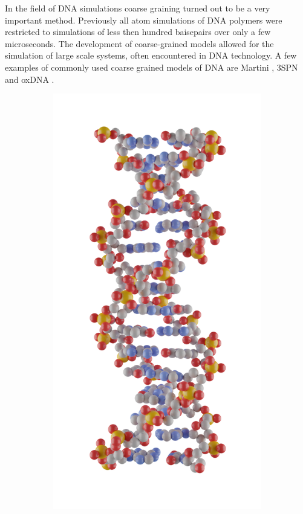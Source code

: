In the field of DNA simulations coarse graining turned out to be a very important
method. Previously all atom simulations of DNA polymers were restricted to simulations of
less then hundred baisepairs over only a few microseconds. The development of
coarse-grained models allowed for the simulation of large scale systems, often
encountered in DNA technology. A few examples of commonly used coarse grained models of
DNA are Martini \cite{Souza2021}, 3SPN \cite{Freeman2011} and oxDNA
\cite{Ouldridge2010}.\\

\begin{figure}[ht]
  \begin{centering}
  \begin{subfigure}[t]{\dimexpr.3\linewidth-1.3em\relax}
  \centering
  \vspace{-0.9cm}
  \includegraphics[width=.9\linewidth,valign=t]{Figures/ballnstick.png}

\end{subfigure}
\end{centering}
\end{figure}

